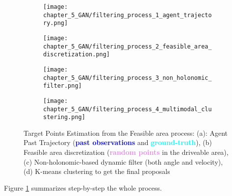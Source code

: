 \begin{figure}[!ht]
	\centering
	\begin{subfigure}{0.24\textwidth}
		\texttt{[image: chapter\_5\_GAN/filtering\_process\_1\_agent\_trajectory.png]}	
		\caption{}
	\end{subfigure}
	\hfill
	\begin{subfigure}{0.24\textwidth}
		\texttt{[image: chapter\_5\_GAN/filtering\_process\_2\_feasible\_area\_discretization.png]}
		\caption{}
	\end{subfigure}
	\hfill
	\begin{subfigure}{0.24\textwidth}
		\texttt{[image: chapter\_5\_GAN/filtering\_process\_3\_non\_holonomic\_filter.png]}
		\caption{}
	\end{subfigure}
	\hfill
	\begin{subfigure}{0.24\textwidth}
		\texttt{[image: chapter\_5\_GAN/filtering\_process\_4\_multimodal\_clustering.png]}
		\caption{}
	\end{subfigure}
	\captionsetup{justification=justified}
	\caption[Target Points Estimation from the Feasible area process]{Target Points Estimation from the Feasible area process: (a): Agent Past Trajectory (\textbf{\textcolor{blue}{past observations}} and \textbf{\textcolor{aqua}{ground-truth}}), (b) Feasible area discretization (\textbf{\textcolor{violet}{random points}} in the driveable area), (c) Non-holonomic-based dynamic filter (both angle and velocity), (d) K-means clustering to get the final proposals}
	\label{fig:chapter_5_GAN/target_points_extraction}
\end{figure}

Figure \ref{fig:chapter_5_GAN/target_points_extraction} summarizes step-by-step the whole process.

